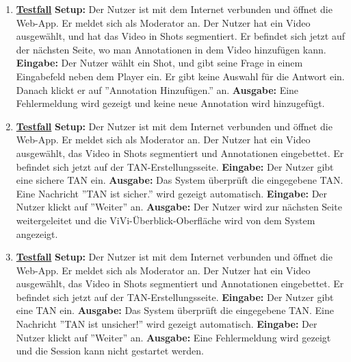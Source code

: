 \begin{enumerate}
	\item \underline{\textbf{Testfall}} \linebreak
	\textbf{Setup:} Der Nutzer ist mit dem Internet verbunden und öffnet die Web-App. Er meldet sich als Moderator an. Der Nutzer hat ein Video ausgewählt, und hat das Video in Shots segmentiert. Er befindet sich jetzt auf der nächsten Seite, wo man Annotationen in dem Video hinzufügen kann.\linebreak
	\textbf{Eingabe:} Der Nutzer wählt ein Shot, und gibt seine Frage in einem Eingabefeld neben dem Player ein. Er gibt keine Auswahl für die Antwort ein. Danach klickt er auf ''Annotation Hinzufügen.'' an.\linebreak
	\textbf{Ausgabe:} Eine Fehlermeldung wird gezeigt und keine neue Annotation wird hinzugefügt.
	
	\item \underline{\textbf{Testfall}} \linebreak
	\textbf{Setup:} Der Nutzer ist mit dem Internet verbunden und öffnet die Web-App. Er meldet sich als Moderator an. Der Nutzer hat ein Video ausgewählt, das Video in Shots segmentiert und Annotationen eingebettet. Er befindet sich jetzt auf der TAN-Erstellungsseite.\linebreak
	\textbf{Eingabe:} Der Nutzer gibt eine sichere TAN ein.\linebreak
	\textbf{Ausgabe:} Das System überprüft die eingegebene TAN. Eine Nachricht ''TAN ist sicher.'' wird gezeigt automatisch.\linebreak
	\textbf{Eingabe:} Der Nutzer klickt auf ''Weiter'' an.\linebreak
	\textbf{Ausgabe:} Der Nutzer wird zur nächsten Seite weitergeleitet und die ViVi-Überblick-Oberfläche wird von dem System angezeigt.
	
	\item \underline{\textbf{Testfall}} \linebreak
	\textbf{Setup:} Der Nutzer ist mit dem Internet verbunden und öffnet die Web-App. Er meldet sich als Moderator an. Der Nutzer hat ein Video ausgewählt, das Video in Shots segmentiert und Annotationen eingebettet. Er befindet sich jetzt auf der TAN-Erstellungsseite.\linebreak
	\textbf{Eingabe:} Der Nutzer gibt eine TAN ein.\linebreak
	\textbf{Ausgabe:} Das System überprüft die eingegebene TAN. Eine Nachricht ''TAN ist unsicher!'' wird gezeigt automatisch.\linebreak
	\textbf{Eingabe:} Der Nutzer klickt auf ''Weiter'' an.\linebreak
	\textbf{Ausgabe:} Eine Fehlermeldung wird gezeigt und die Session kann nicht gestartet werden.
	

\end{enumerate}
